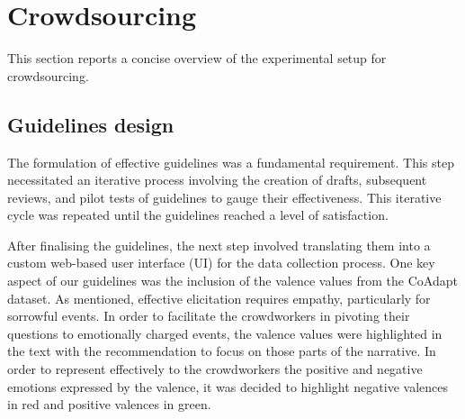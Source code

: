 
\section{Crowdsourcing}
This section reports a concise overview of the experimental setup for crowdsourcing.
\subsection{Guidelines design}
The formulation of effective guidelines was a fundamental requirement. This step necessitated an iterative process involving the creation of drafts, subsequent reviews, and pilot tests of guidelines to gauge their effectiveness. This iterative cycle was repeated until the guidelines reached a level of satisfaction.

After finalising the guidelines, the next step involved translating them into a custom web-based user interface (UI) for the data collection process. One key aspect of our guidelines was the inclusion of the valence values from the CoAdapt dataset. 
As mentioned, effective elicitation requires empathy, particularly for sorrowful events. In order to facilitate the crowdworkers in pivoting their questions to emotionally charged events, the valence values were highlighted in the text with the recommendation to focus on those parts of the narrative. In order to represent effectively to the crowdworkers the positive and negative emotions expressed by the valence, it was decided to highlight negative valences in red and positive valences in green. 

